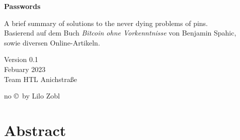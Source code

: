 \documentclass[10pt,a4paper,titlepage]{paper}
\begin{document}
\begin{center}
		\vspace*{1cm}
		
		\Huge \bf Passwords\\
		\vspace{5cm}
		
		
		
		
		
		\vspace{1.5cm}
		\huge A brief summary of solutions to the never dying problems of pins. \\
		\vspace{2cm}
		\Large Basierend auf dem Buch \textit{Bitcoin ohne Vorkenntnisse} von Benjamin Spahic,\\ sowie diversen Online-Artikeln.
		\vspace*{1.5cm}
		
		\Large Version 0.1\\
		\large Febuary 2023\\
		\large Team HTL Anichstraße\\[30pt]
		\vspace{1cm}
		
		
		\vspace*{5cm}	
	
		

        \large no \copyright\ by Lilo Zobl\\
        
\end{center}
\newpage    %


\tableofcontents
\newpage
\listoffigures
\listoftables
\clearpage

\section{Abstract}
\end{document}
